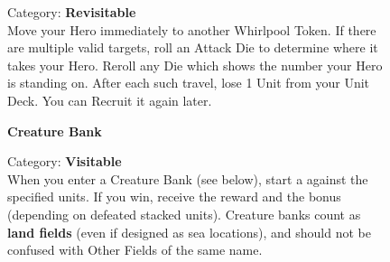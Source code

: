 \begin{figure}[H]
	\begin{minipage}[t]{0.47\textwidth}
		\vspace{0pt}
		\centering
		\phantom{j}\par
		\caption{\small Category: \textbf{Revisitable}\\
			Move your Hero immediately to another Whirlpool Token.
			If there are multiple valid targets, roll an Attack Die to determine where it takes your Hero. Reroll any Die which shows the number your Hero is standing on.
			After each such travel, lose 1 Unit from your Unit Deck. You can Recruit it again later.} %
	\end{minipage}\hfill
	\begin{minipage}[t]{0.47\textwidth}
		\vspace{0pt}
		\centering
		\phantom{j}\textbf{Creature Bank}\par
		\caption{\small Category: \textbf{Visitable}\\
			When you enter a Creature Bank (see  below), start a  against the specified units. If you win, receive the reward and the bonus (depending on defeated stacked units). Creature banks count as \textbf{land fields} (even if designed as sea locations), and should not be confused with Other Fields of the same name.
		}
	\end{minipage}
\end{figure}

